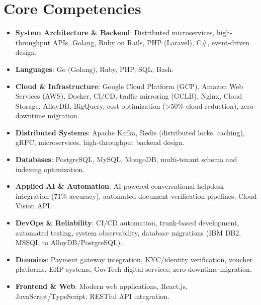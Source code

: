 \documentclass[11pt,a4paper,sans]{moderncv}
\begin{document}
\section{Core Competencies}
\vspace{1pt}
\begin{itemize}

\item \textbf{System Architecture \& Backend}: Distributed microservices, high-throughput APIs, Golang, Ruby on Rails, PHP (Laravel), C\#, event-driven design.
\item \textbf{Languages}: Go (Golang), Ruby, PHP, SQL, Bash.

\item \textbf{Cloud \& Infrastructure}: Google Cloud Platform (GCP), Amazon Web Services (AWS), Docker, CI/CD, traffic mirroring (GCLB), Nginx, Cloud Storage, AlloyDB, BigQuery, cost optimization (>50\% cloud reduction), zero-downtime migration.
\item \textbf{Distributed Systems}: Apache Kafka, Redis (distributed locks, caching), gRPC, microservices, high-throughput backend design.

\item \textbf{Databases}: PostgreSQL, MySQL, MongoDB, multi-tenant schema and indexing optimization.
\item \textbf{Applied AI \& Automation}: AI-powered conversational helpdesk integration (71\% accuracy), automated document verification pipelines, Cloud Vision API.

\item \textbf{DevOps \& Reliability}: CI/CD automation, trunk-based development, automated testing, system observability, database migrations (IBM DB2, MSSQL to AlloyDB/PostgreSQL).

\item \textbf{Domains}: Payment gateway integration, KYC/identity verification, voucher platforms, ERP systems, GovTech digital services, zero-downtime migration.
\item \textbf{Frontend \& Web}: Modern web applications, React.js, JavaScript/TypeScript, RESTful API integration.

\end{itemize}

\end{document}
